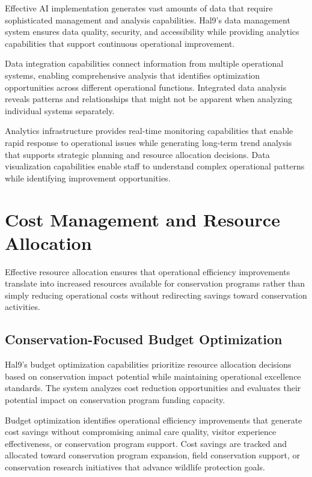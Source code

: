 \documentclass[
  Letterpaper,
]{scrbook}
\begin{document}
Effective AI implementation generates vast amounts of data that require
sophisticated management and analysis capabilities. Hal9's data
management system ensures data quality, security, and accessibility
while providing analytics capabilities that support continuous
operational improvement.

Data integration capabilities connect information from multiple
operational systems, enabling comprehensive analysis that identifies
optimization opportunities across different operational functions.
Integrated data analysis reveals patterns and relationships that might
not be apparent when analyzing individual systems separately.

Analytics infrastructure provides real-time monitoring capabilities that
enable rapid response to operational issues while generating long-term
trend analysis that supports strategic planning and resource allocation
decisions. Data visualization capabilities enable staff to understand
complex operational patterns while identifying improvement
opportunities.

\section{Cost Management and Resource
Allocation}\label{cost-management-and-resource-allocation}

Effective resource allocation ensures that operational efficiency
improvements translate into increased resources available for
conservation programs rather than simply reducing operational costs
without redirecting savings toward conservation activities.

\subsection{Conservation-Focused Budget
Optimization}\label{conservation-focused-budget-optimization}

Hal9's budget optimization capabilities prioritize resource allocation
decisions based on conservation impact potential while maintaining
operational excellence standards. The system analyzes cost reduction
opportunities and evaluates their potential impact on conservation
program funding capacity.

Budget optimization identifies operational efficiency improvements that
generate cost savings without compromising animal care quality, visitor
experience effectiveness, or conservation program support. Cost savings
are tracked and allocated toward conservation program expansion, field
conservation support, or conservation research initiatives that advance
wildlife protection goals.
\end{document}
